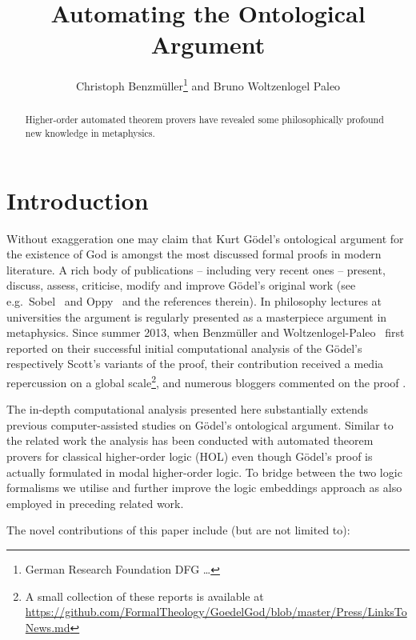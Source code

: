 \documentclass{article}
\title{Automating the Ontological Argument}
\author{Christoph Benzmüller\thanks{German Research Foundation DFG \ldots} and Bruno Woltzenlogel Paleo}
\author{}
\begin{document}
\maketitle

\begin{abstract}
  Higher-order automated theorem provers have revealed some
  philosophically profound new knowledge in metaphysics.
\end{abstract}

\section{Introduction}
Without exaggeration one may claim that Kurt G\"{o}del's ontological
argument for the existence of God \cite{GoedelNotes,ScottNotes} is
amongst the most discussed formal proofs in modern literature. A rich
body of publications -- including very recent ones -- present,
discuss, assess, criticise, modify and improve G\"{o}del's original
work (see e.g.~Sobel~ and Oppy~ and the
references therein).  In philosophy lectures at universities the
argument is regularly presented as a masterpiece argument in
metaphysics. Since summer 2013, when Benzm\"uller and Woltzenlogel-Paleo~ first
reported on their successful initial computational
analysis of the G\"odel's respectively Scott's variants of the proof,
their contribution received a media repercussion on a global scale\footnote{A
  small collection of these reports is available at {\scriptsize
    \url{https://github.com/FormalTheology/GoedelGod/blob/master/Press/LinksToNews.md}}},
and numerous bloggers commented on the proof
\cite{fuhrmann15:_blogg_goedel}.

The in-depth computational analysis presented here substantially
extends previous computer-assisted studies on G\"odel's ontological
argument. Similar to the related work \cite{J30,C40} the analysis has
been conducted with automated theorem provers for classical
higher-order logic (HOL) even though G\"odel's proof is actually
formulated in modal higher-order logic. To bridge between the two
logic formalisms we utilise and further improve the logic embeddings
approach \cite{J23,C40} as also employed in preceding related work.


The novel contributions of this paper include (but are not limited to):
\end{document}
